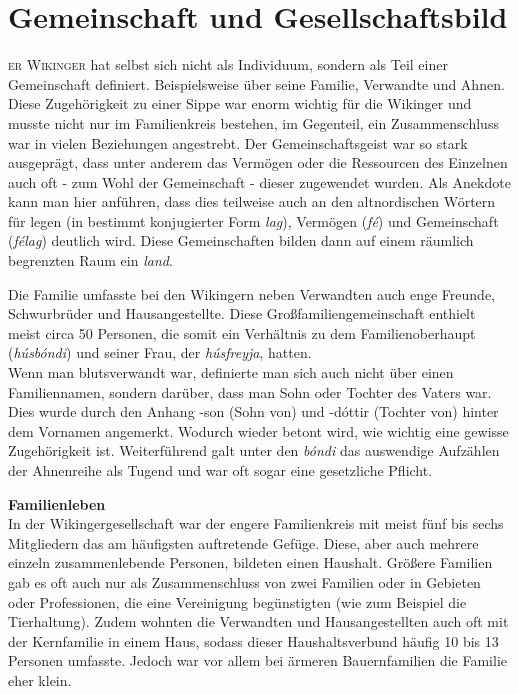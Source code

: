 \documentclass[12pt,a4paper,ngerman,openany]{book}
\newcommand{\flettrine}[2]{\lettrine[lines=2, depth=0, loversize=0.25, nindent=0.69pt, lraise=0.15]{\initfamily{#1}}{#2}}
\newcommand*\initfamily{\usefont{U}{GotIn}{xl}{n}}
\begin{document}
\section{Gemeinschaft und Gesellschaftsbild}
\flettrine{D}{er Wikinger} hat selbst sich nicht als Individuum, sondern als Teil einer Gemeinschaft definiert. Beispielsweise über seine Familie, Verwandte und Ahnen. Diese Zugehörigkeit zu einer Sippe war enorm wichtig für die Wikinger und musste nicht nur im Familienkreis bestehen, im Gegenteil, ein Zusammenschluss war in vielen Beziehungen angestrebt. Der Gemeinschaftsgeist war so stark ausgeprägt, dass unter anderem das Vermögen oder die Ressourcen des Einzelnen auch oft - zum Wohl der Gemeinschaft - dieser zugewendet wurden. Als Anekdote kann man hier anführen, dass dies teilweise auch an den altnordischen Wörtern für legen (in bestimmt konjugierter Form \textit{lag}), Vermögen (\textit{fé}) und Gemeinschaft (\textit{félag}) deutlich wird. Diese Gemeinschaften bilden dann auf einem räumlich begrenzten Raum ein \textit{land}.

Die Familie umfasste bei den Wikingern neben Verwandten auch enge Freunde,
Schwurbrüder und Hausangestellte. Diese Großfamiliengemeinschaft enthielt meist circa 50 Personen, die somit ein Verhältnis zu dem Familienoberhaupt (\textit{húsbóndi}) und seiner Frau, der \textit{húsfreyja}, hatten.\\
Wenn man blutsverwandt war, definierte man sich auch nicht über einen Familiennamen, sondern darüber, dass man Sohn oder Tochter des Vaters war. Dies wurde durch den Anhang -son (Sohn von) und -dóttir (Tochter von) hinter dem Vornamen angemerkt.
Wodurch wieder betont wird, wie wichtig eine gewisse \glqq Zugehörigkeit\grqq{} ist. Weiterführend galt unter den \textit{bóndi} das auswendige Aufzählen der Ahnenreihe als Tugend und war oft sogar eine gesetzliche Pflicht.

\textbf{Familienleben}\\
In der Wikingergesellschaft war der engere Familienkreis mit meist fünf bis sechs Mitgliedern das am häufigsten auftretende Gefüge. Diese, aber auch mehrere einzeln zusammenlebende Personen, bildeten einen Haushalt. Größere Familien gab es oft auch nur als Zusammenschluss von zwei Familien oder in Gebieten oder Professionen, die eine Vereinigung begünstigten (wie zum Beispiel die Tierhaltung). Zudem wohnten die Verwandten und Hausangestellten auch oft mit der Kernfamilie in einem Haus, sodass dieser Haushaltsverbund häufig 10 bis 13 Personen umfasste. Jedoch war vor allem bei ärmeren Bauernfamilien die Familie eher klein.
\end{document}
